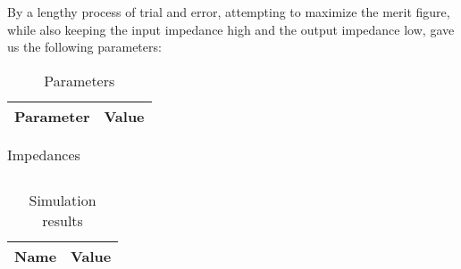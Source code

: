 By a lengthy process of trial and error, attempting to maximize the merit figure, while also keeping the input impedance high and the output impedance low, gave us the following parameters:

\begin{table}[H]
        \centering
        \begin{tabular}{|c|c|}
        \hline
        Parameter & Value \\
        \hline
        
        \hline
        \end{tabular}
        \caption{Parameters}
        \label{param}
\end{table}



\begin{table}[H]
  \centering
  \begin{tabular}{|c|c|}
    \hline
        
        \hline
  \end{tabular}
  \caption{Impedances}
  \label{tab:sim_imp}
\end{table}

\begin{table}[H]
  \centering
  \begin{tabular}{|c|c|}
    \hline
        {\bf Name} & {\bf Value} \\
        \hline
        \hline
        
        \hline
  \end{tabular}
  \caption{Simulation results}
\end{table}

